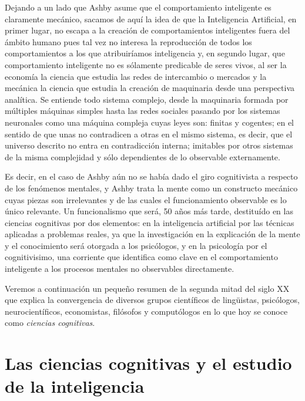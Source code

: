 \documentclass[12pt]{memoir}
\begin{document}
Dejando a un lado que Ashby asume que el comportamiento inteligente es claramente mecánico, sacamos de aquí la idea de que la Inteligencia Artificial, en primer lugar, no escapa a la creación de comportamientos inteligentes fuera del ámbito humano pues tal vez no interesa la reproducción de todos los comportamientos a los que atribuiríamos inteligencia y, en segundo lugar, que comportamiento inteligente no es sólamente predicable de seres vivos, al ser la economía la ciencia que estudia las redes de intercambio o mercados y la mecánica la ciencia que estudia la creación de maquinaria desde una perspectiva analítica. Se entiende todo sistema complejo, desde la maquinaria formada por múltiples máquinas simples hasta las redes sociales pasando por los sistemas neuronales como una máquina compleja cuyas leyes son: finitas y cogentes; en el sentido de que unas no contradicen a otras en el mismo sistema, es decir, que el universo descrito no entra en contradicción interna; imitables por otros sistemas de la misma complejidad y sólo dependientes de lo observable externamente.
 
Es decir, en el caso de Ashby aún no se había dado el giro cognitivista a respecto de los fenómenos mentales, y Ashby trata la mente como un constructo mecánico cuyas piezas son irrelevantes y de las cuales el funcionamiento observable es lo único relevante. Un funcionalismo que será, 50 años más tarde, destituído en las ciencias cognitivas por dos elementos: en la inteligencia artificial por las técnicas aplicadas a problemas reales, ya que la investigación en la explicación de la mente y el conocimiento será otorgada a los psicólogos, y en la psicología por el cognitivisimo, una corriente que identifica como clave en el comportamiento inteligente a los procesos mentales no observables directamente. 

Veremos a continuación un pequeño resumen de la segunda mitad del siglo XX que explica la convergencia de diversos grupos científicos de lingüistas, psicólogos, neurocientíficos, economistas, filósofos y computólogos en lo que hoy se conoce como \textit{ciencias cognitivas}.

\section{Las ciencias cognitivas y el estudio de la inteligencia}
\end{document}
